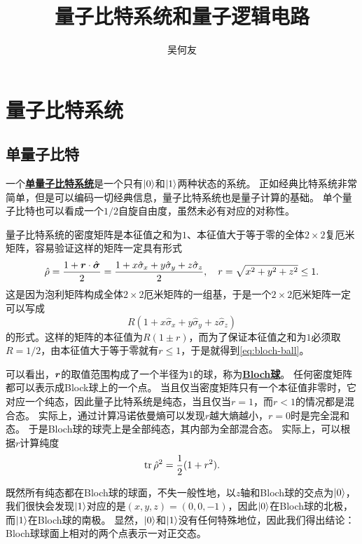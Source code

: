 \documentclass[hyperref, UTF8, a4paper]{ctexart}
\title{量子比特系统和量子逻辑电路}
\author{吴何友}
\newcommand*{\concept}[1]{\underline{\textbf{#1}}}
\begin{document}
\maketitle

\section{量子比特系统}

\subsection{单量子比特}

一个\concept{单量子比特系统}是一个只有$\ket{0}$和$\ket{1}$两种状态的系统。
正如经典比特系统非常简单，但是可以编码一切经典信息，量子比特系统也是量子计算的基础。
单个量子比特也可以看成一个$1/2$自旋自由度，虽然未必有对应的对称性。

量子比特系统的密度矩阵是本征值之和为$1$、本征值大于等于零的全体$2 \times 2$复厄米矩阵，容易验证这样的矩阵一定具有形式
\begin{equation}
    \hat{\rho} = \frac{1 + \vb*{r} \cdot \hat{\vb*{\sigma}}}{2} = \frac{1 + x \hat{\sigma}_x + y \hat{\sigma}_y + z \hat{\sigma}_z}{2}, \quad r = \sqrt{x^2+y^2+z^2} \leq 1.
    \label{eq:bloch-ball}
\end{equation}
这是因为泡利矩阵构成全体$2\times 2$厄米矩阵的一组基，于是一个$2\times 2$厄米矩阵一定可以写成
\[
    R(1 + x \hat{\sigma}_x + y \hat{\sigma}_y + z \hat{\sigma}_z)
\]
的形式。这样的矩阵的本征值为$R(1 \pm r)$，而为了保证本征值之和为$1$必须取$R=1/2$，由本征值大于等于零就有$r\leq 1$，于是就得到\eqref{eq:bloch-ball}。

可以看出，$\vb*{r}$的取值范围构成了一个半径为$1$的球，称为\concept{Bloch球}。
任何密度矩阵都可以表示成Block球上的一个点。
当且仅当密度矩阵只有一个本征值非零时，它对应一个纯态，因此量子比特系统是纯态，当且仅当$r=1$，而$r<1$的情况都是混合态。
实际上，通过计算冯诺依曼熵可以发现$r$越大熵越小，$r=0$时是完全混和态。
于是Bloch球的球壳上是全部纯态，其内部为全部混合态。
实际上，可以根据$r$计算纯度
\begin{equation}
    \trace \hat{\rho}^2 = \frac{1}{2} (1 + r^2).
\end{equation}

既然所有纯态都在Bloch球的球面，不失一般性地，以$z$轴和Bloch球的交点为$\ket{0}$，我们很快会发现$\ket{1}$对应的是$(x, y, z) = (0, 0, -1)$，因此$\ket{0}$在Bloch球的北极，而$\ket{1}$在Bloch球的南极。
显然，$\ket{0}$和$\ket{1}$没有任何特殊地位，因此我们得出结论：Bloch球球面上相对的两个点表示一对正交态。
\end{document}
